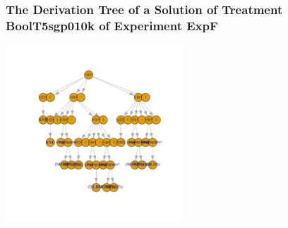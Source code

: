  \begin{frame}
 \frametitle{ The Derivation Tree of a Solution of Treatment BoolT5sgp010k of Experiment ExpF }
 \begin{center}
\includegraphics[width=0.5\textwidth, angle=0]
{ExpFDerivationTreeFigure008.pdf}
 \end{center}
 \label{templateReport/ExpFDerivationTreeFigure008.pdf}  
 \end{frame}

